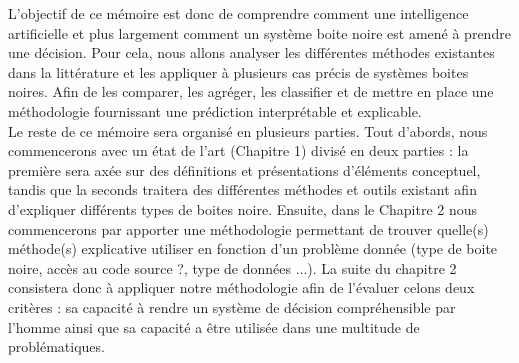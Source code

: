 L’objectif de ce mémoire est donc de comprendre comment une intelligence artificielle et plus largement comment un système boite noire est amené à prendre une décision. Pour cela, nous allons analyser les différentes méthodes existantes dans la littérature et les appliquer à plusieurs cas précis de systèmes boites noires. Afin de les comparer, les agréger, les classifier et de mettre en place une méthodologie fournissant une prédiction interprétable et explicable.\\

Le reste de ce mémoire sera organisé en plusieurs parties. Tout d'abords, nous commencerons avec un état de l'art (Chapitre 1) divisé en deux parties : la première sera axée sur des définitions et présentations d'éléments conceptuel, tandis que la seconds traitera des différentes méthodes et outils existant afin d'expliquer différents types de boites noire. Ensuite, dans le Chapitre 2 nous commencerons par apporter une méthodologie permettant de trouver quelle(s) méthode(s) explicative utiliser en fonction d'un problème donnée (type de boite noire, accès au code source ?, type de données ...). La suite du chapitre 2 consistera donc à appliquer notre méthodologie afin de l'évaluer celons deux critères : sa capacité à rendre un système de décision compréhensible par l'homme ainsi que sa capacité a être utilisée dans une multitude de problématiques.

